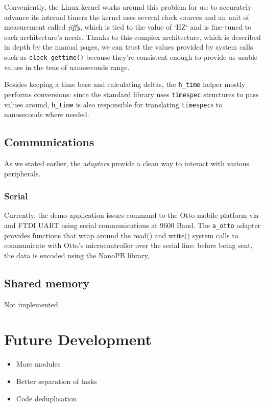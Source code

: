 \documentclass[a4paper,12pt]{report}
\begin{document}
Conveniently, the Linux kernel works around this problem for us: to accurately advance its internal timers the kernel uses several clock sources and an unit of measurement called \textit{jiffy}, which is tied to the value of `HZ` and is fine-tuned to each architecture's needs\cite{elinux-hrts}. Thanks to this complex architecture, which is described in depth by the manual pages\cite{man-clock-getres-2}, we can trust the values provided by system calls such as \texttt{clock\_gettime()} because they're consistent enough to provide us usable values in the tens of nanoseconds range.

Besides keeping a time base and calculating deltas, the \texttt{h\_time} helper mostly performs conversions: since the standard library uses \texttt{timespec} structures to pass values around, \texttt{h\_time} is also responsible for translating \texttt{timespec}s to nanoseconds where needed.  

\subsection{Communications}

As we stated earlier, the \textit{adapters} provide a clean way to interact with various peripherals.

\subsubsection{Serial}

Currently, the demo application issues command to the Otto mobile platform via and FTDI UART using serial communications at 9600 Baud. The \texttt{a\_otto} adapter provides functions that wrap around the read() and write() system calls to communicate with Otto's microcontroller over the serial line: before being sent, the data is encoded using the NanoPB library,  

\subsection{Shared memory}

Not implemented.

\section{Future Development}

\begin{itemize}
    \item More modules
    \item Better separation of tasks
    \item Code deduplication
\end{itemize}
\end{document}
